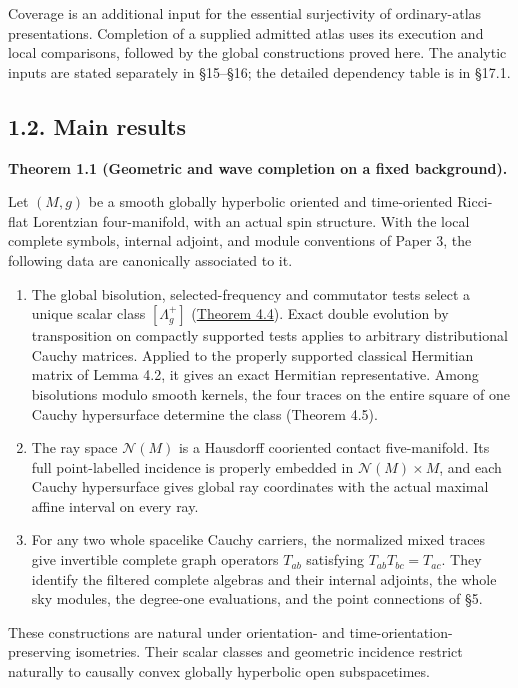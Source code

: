 \documentclass[
  english,
  11pt,
  reqno]{amsart}
\makeatletter
\providecommand{\tightlist}{%
  \setlength{\itemsep}{0pt}\setlength{\parskip}{0pt}}
\newcommand{\paperdisplaynext}{%
  \let\paper@savedstartsection\@startsection
  \def\@startsection##1##2##3##4##5##6{%
    \let\@startsection\paper@savedstartsection
    \@tempskipa ##5\relax
    \ifdim\@tempskipa<\z@
      \def\paper@afterskip{.35\baselineskip}%
    \else
      \def\paper@afterskip{##5}%
    \fi
    \@startsection{##1}{##2}{##3}{##4}{\paper@afterskip}{##6}}}
\newcommand{\paperdisplaysection}{\paperdisplaynext\subsection}
\newcommand{\pandocstatementheading}[1]{%
  \par\if@nobreak\else
    \addpenalty{\@beginparpenalty}%
    \addvspace{.5\baselineskip plus .2\baselineskip minus .2\baselineskip}%
  \fi
  {\normalfont\bfseries #1\par}%
  \nobreak\@afterindenttrue\@afterheading
}
\makeatother
\begin{document}
Coverage is an additional input for the essential surjectivity of
ordinary-atlas presentations. Completion of a supplied admitted atlas
uses its execution and local comparisons, followed by the global
constructions proved here. The analytic inputs are stated separately in
§15--§16; the detailed dependency table is in §17.1.

\protect{}\label{sec:overview-main-results}
\paperdisplaysection{1.2. Main results}\label{main-results}
\pandocstatementheading{\protect{}\label{thm:global-wave-completion-overview}Theorem 1.1 (Geometric and wave completion on a fixed background).}

Let \((M,g)\) be a smooth globally hyperbolic oriented and time-oriented
Ricci-flat Lorentzian four-manifold, with an actual spin structure. With
the local complete symbols, internal adjoint, and module conventions of
Paper 3, the following data are canonically associated to it.

\begin{enumerate}
\tightlist
\item
  The global bisolution, selected-frequency and commutator tests select
  a unique scalar class \([\Lambda_g^+]\)
  (\hyperref[thm:p4-global-canonical-wave-class]{Theorem 4.4}). Exact
  double evolution by transposition on compactly supported tests applies
  to arbitrary distributional Cauchy matrices. Applied to the properly
  supported classical Hermitian matrix of Lemma 4.2, it gives an exact
  Hermitian representative. Among bisolutions modulo smooth kernels, the
  four traces on the entire square of one Cauchy hypersurface determine
  the class (Theorem 4.5).
\item
  The ray space \(\mathcal N(M)\) is a Hausdorff cooriented contact
  five-manifold. Its full point-labelled incidence is properly embedded
  in \(\mathcal N(M)\times M\), and each Cauchy hypersurface gives
  global ray coordinates with the actual maximal affine interval on
  every ray.
\item
  For any two whole spacelike Cauchy carriers, the normalized mixed
  traces give invertible complete graph operators \(T_{ab}\) satisfying
  \(T_{ab}T_{bc}=T_{ac}\). They identify the filtered complete algebras
  and their internal adjoints, the whole sky modules, the degree-one
  evaluations, and the point connections of §5.
\end{enumerate}

These constructions are natural under orientation- and
time-orientation-preserving isometries. Their scalar classes and
geometric incidence restrict naturally to causally convex globally
hyperbolic open subspacetimes.
\end{document}
